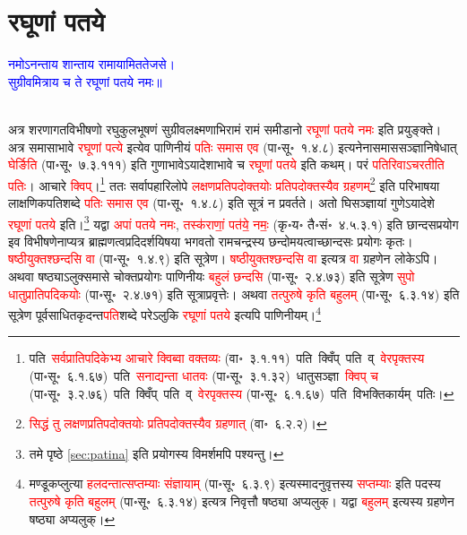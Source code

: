 \section[रघूणां पतये]{रघूणां पतये}
\centering\textcolor{blue}{नमोऽनन्ताय शान्ताय रामायामिततेजसे।\nopagebreak\\
सुग्रीवमित्राय च ते रघूणां पतये नमः॥}\nopagebreak\\
\\
\begin{sloppypar}\justifying\noindent\hspace{10mm} अत्र शरणागत\-विभीषणो रघु\-कुल\-भूषणं सुग्रीव\-लक्ष्मणाभिरामं रामं समीडानो \textcolor{red}{रघूणां पतये नमः} इति प्रयुङ्क्ते। अत्र समासाभावे \textcolor{red}{रघूणां पत्ये} इत्येव पाणिनीयं \textcolor{red}{पतिः समास एव} (पा॰सू॰~१.४.८) इत्यनेनासमास\-सञ्ज्ञा\-निषेधात् \textcolor{red}{घेर्ङिति} (पा॰सू॰~७.३.१११) इति गुणाभावेऽयादेशाभावे च \textcolor{red}{रघूणां पतये} इति कथम्। परं \textcolor{red}{पतिरिवाऽचरतीति पतिः}। आचारे \textcolor{red}{क्विप्}।\footnote{पति~\arrow \textcolor{red}{सर्वप्राति\-पदिकेभ्य आचारे क्विब्वा वक्तव्यः} (वा॰~३.१.११)~\arrow पति~क्विँप्~\arrow पति~व्~\arrow \textcolor{red}{वेरपृक्तस्य} (पा॰सू॰~६.१.६७)~\arrow पति~\arrow \textcolor{red}{सनाद्यन्ता धातवः} (पा॰सू॰~३.१.३२)~\arrow धातुसञ्ज्ञा~\arrow \textcolor{red}{क्विप् च} (पा॰सू॰~३.२.७६)~\arrow पति~क्विँप्~\arrow पति~व्~\arrow \textcolor{red}{वेरपृक्तस्य} (पा॰सू॰~६.१.६७)~\arrow पति~\arrow विभक्ति\-कार्यम्~\arrow पतिः।} ततः सर्वापहारि\-लोपे \textcolor{red}{लक्षण\-प्रतिपदोक्तयोः प्रतिपदोक्तस्यैव ग्रहणम्‌}\footnote{\textcolor{red}{सिद्धं तु लक्षण\-प्रतिपदोक्तयोः प्रतिपदोक्तस्यैव ग्रहणात्} (वा॰~६.२.२)।} इति परिभाषया लाक्षणिक\-पति\-शब्दे \textcolor{red}{पतिः समास एव} (पा॰सू॰~१.४.८) इति सूत्रं न प्रवर्तते। अतो घि\-सञ्ज्ञायां गुणेऽयादेशे \textcolor{red}{रघूणां पतये} इति।\footnote{\pageref{sec:patina}तमे पृष्ठे \ref{sec:patina}  इति प्रयोगस्य विमर्शमपि पश्यन्तु।} यद्वा \textcolor{red}{अपां पतये नमः}, \textcolor{red}{तस्क॑राणां॒ पत॑ये॒ नमः॒} (कृ॰य॰ तै॰सं॰~४.५.३.१) इति छान्दस\-प्रयोग इव विभीषणेनाप्यत्र
ब्राह्मणत्व\-प्रदिदर्शयिषया भगवतो रामचन्द्रस्य छन्दोमयत्वाच्छान्दसः प्रयोगः कृतः। \textcolor{red}{षष्ठीयुक्तश्छन्दसि वा} (पा॰सू॰~१.४.९) इति सूत्रेण। \textcolor{red}{षष्ठीयुक्तश्छन्दसि वा} इत्यत्र \textcolor{red}{वा} ग्रहणेन लोकेऽपि। अथवा षष्ठ्याऽलुक्समासे चोक्त\-प्रयोगः पाणिनीयः \textcolor{red}{बहुलं छन्दसि} (पा॰सू॰~२.४.७३) इति सूत्रेण \textcolor{red}{सुपो धातु\-प्रातिपदिकयोः} (पा॰सू॰~२.४.७१) इति सूत्राप्रवृत्तेः। अथवा \textcolor{red}{तत्पुरुषे कृति बहुलम्‌} (पा॰सू॰~६.३.१४) इति सूत्रेण पूर्व\-साधित\-कृदन्त\-\textcolor{red}{पति}\-शब्दे परेऽलुकि \textcolor{red}{रघूणां पतये} इत्यपि पाणिनीयम्।\footnote{मण्डूक\-प्लुत्या \textcolor{red}{हलदन्तात्सप्तम्याः संज्ञायाम्‌} (पा॰सू॰~६.३.९) इत्यस्मादनुवृत्तस्य \textcolor{red}{सप्तम्याः} इति पदस्य \textcolor{red}{तत्पुरुषे कृति बहुलम्‌} (पा॰सू॰~६.३.१४) इत्यत्र निवृत्तौ षष्ठ्या अप्यलुक्। यद्वा \textcolor{red}{बहुलम्‌} इत्यस्य ग्रहणेन षष्ठ्या अप्यलुक्।}\end{sloppypar}
